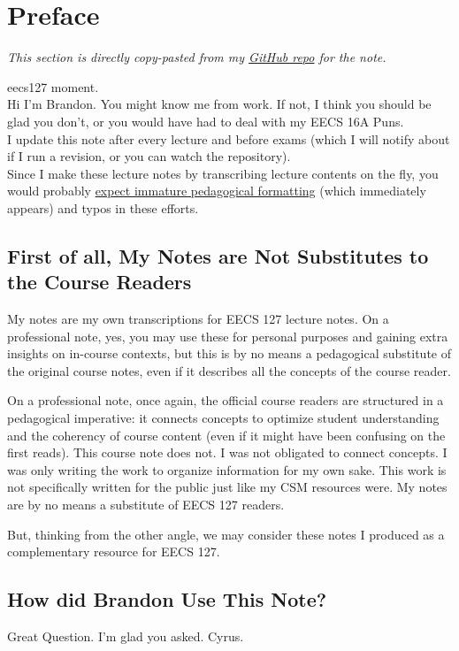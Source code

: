 \section{Preface}
\textit{This section is directly copy-pasted from my \href{https://github.com/Bransthre/eecs127-notes}{GitHub repo} for the note.}

eecs127 moment. \\
Hi I'm Brandon. You might know me from work.
If not, I think you should be glad you don't, or you would have had to deal with my EECS 16A Puns. \\
I update this note after every lecture and before exams (which I will notify about if I run a revision, or you can watch the repository). \\
Since I make these lecture notes by transcribing lecture contents on the fly, you would probably \underline{expect immature pedagogical formatting} (which immediately appears) and typos in these efforts.

\subsection{First of all, My Notes are Not Substitutes to the Course Readers}
My notes are my own transcriptions for EECS 127 lecture notes.
On a professional note, yes, you may use these for personal purposes and gaining extra insights on in-course contexts, but this is by no means a pedagogical substitute of the original course notes, even if it describes all the concepts of the course reader.

On a professional note, once again, the official course readers are structured in a pedagogical imperative: it connects concepts to optimize student understanding and the coherency of course content (even if it might have been confusing on the first reads).
This course note does not. I was not obligated to connect concepts. I was only writing the work to organize information for my own sake.
This work is not specifically written for the public just like my CSM resources were. My notes are by no means a substitute of EECS 127 readers.

But, thinking from the other angle, we may consider these notes I produced as a complementary resource for EECS 127.

\subsection{How did Brandon Use This Note?}
Great Question. I'm glad you asked. Cyrus.

